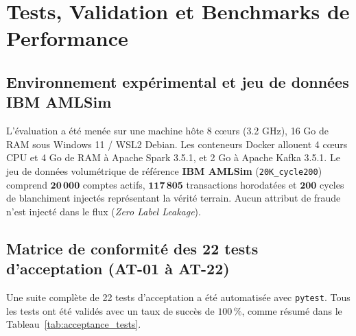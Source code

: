 
\chapter{Tests, Validation et Benchmarks de Performance}
\label{ch:experiments}

\section{Environnement expérimental et jeu de données IBM AMLSim}

L'évaluation a été menée sur une machine hôte 8 cœurs (3.2 GHz), 16 Go de RAM sous Windows 11 / WSL2 Debian. Les conteneurs Docker allouent 4 cœurs CPU et 4 Go de RAM à Apache Spark 3.5.1, et 2 Go à Apache Kafka 3.5.1. Le jeu de données volumétrique de référence \textbf{IBM AMLSim} \cite{weber2018scalable} (\texttt{20K\_cycle200}) comprend $\mathbf{20\,000}$ comptes actifs, $\mathbf{117\,805}$ transactions horodatées et $\mathbf{200}$ cycles de blanchiment injectés représentant la vérité terrain. Aucun attribut de fraude n'est injecté dans le flux (\textit{Zero Label Leakage}).

\section{Matrice de conformité des 22 tests d'acceptation (AT-01 à AT-22)}

Une suite complète de 22 tests d'acceptation a été automatisée avec \texttt{pytest}. Tous les tests ont été validés avec un taux de succès de $100\,\%$, comme résumé dans le Tableau~\ref{tab:acceptance_tests}.

